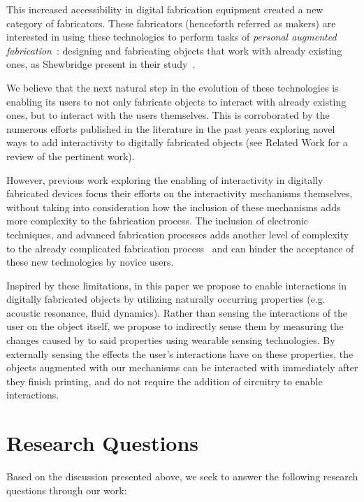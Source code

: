     This increased accessibility in digital fabrication equipment created a new
    category of fabricators. These fabricators (henceforth referred as makers)
    are interested in using these technologies to perform tasks of
    \emph{personal augmented fabrication}~\cite{Ashbrook:2016fga}: designing
    and fabricating objects that work with already existing ones, as Shewbridge
    \etal present in their study~\cite{Shewbridge:2014gl}.

    We believe that the next natural step in the evolution of these
    technologies is enabling its users to not only fabricate objects to
    interact with already existing ones, but to interact with the users
    themselves. This is corroborated by the numerous efforts published in the
    literature in the past years exploring novel ways to add interactivity to
    digitally fabricated objects (see Related Work for a review of the
    pertinent work).

    However, previous work exploring the enabling of interactivity in digitally
    fabricated devices focus their efforts on the interactivity mechanisms
    themselves, without taking into consideration how the inclusion of these
    mechanisms adds more complexity to the fabrication process. The inclusion
    of electronic techniques, and advanced fabrication processes adds another
    level of complexity to the already complicated fabrication
    process~\cite{Hudson:2016hi, Mellis:2012ba, Weichel:2014ed} and can hinder
    the acceptance of these new technologies by novice users.

    Inspired by these limitations, in this paper we propose to enable
    interactions in digitally fabricated objects by utilizing naturally
    occurring properties (e.g. acoustic resonance, fluid dynamics). Rather than
    sensing the interactions of the user on the object itself, we propose to
    indirectly sense them by measuring the changes caused by to said properties
    using wearable sensing technologies. By externally sensing the effects the
    user's interactions have on these properties, the objects augmented with
    our mechanisms can be interacted with immediately after they finish
    printing, and do not require the addition of circuitry to enable
    interactions.

  \section{Research Questions}
    Based on the discussion presented above, we seek to answer the following
    research questions through our work:

